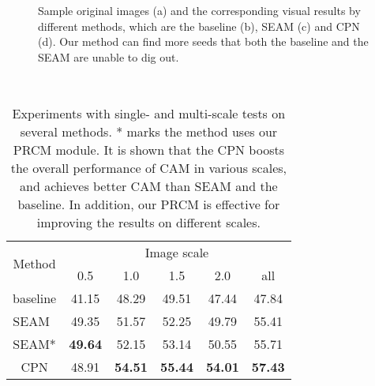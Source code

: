 \documentclass[10pt,twocolumn,letterpaper]{article}
\begin{document}
\begin{figure*}[htbp]
{\begin{minipage}[t]{0.123\linewidth}
        \vspace{0.02cm}
    \end{minipage}}\hspace{-2mm}
\centering
\caption{Sample original images (a) and the corresponding visual results by different methods, which are the baseline (b), SEAM (c) and CPN (d). Our method can find more seeds that both the baseline and the SEAM are unable to dig out.}
\label{fig:compare_fig}
\end{figure*}

\begin{table}[!htbp]\small
\centering\
\begin{tabular}{c|c|c|c|c|c}
\hline
\multirow{2}{*}{Method} &
\multicolumn{5}{|c}{Image scale}\\
\cline{2-6}
  & 0.5 & 1.0 & 1.5 & 2.0 & all\\
\hline
baseline &41.15&48.29&49.51&47.44&47.84\\
SEAM~\cite{seam} & 49.35 & 51.57 & 52.25 & 49.79 & 55.41\\
SEAM* & \textbf{49.64}& 52.15& 53.14 & 50.55 & 55.71\\
CPN &48.91& \textbf{54.51} &\textbf{ 55.44} & \textbf{54.01} & \textbf{57.43}\\
\hline
\end{tabular}
\caption{Experiments with single- and multi-scale tests on several methods. * marks the method uses our PRCM module. It is shown that the CPN boosts the overall performance of CAM in various scales, and achieves better CAM than SEAM and the baseline. In addition, our PRCM is effective for improving the results on different scales.}
\label{tab:scale}
\end{table}
\end{document}
